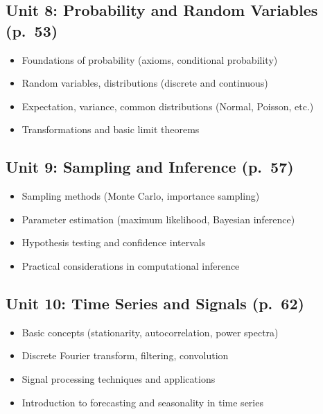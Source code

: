 \documentclass{article}
\begin{document}
\subsection*{Unit 8: Probability and Random Variables (p.~53)}
\begin{itemize}
    \item Foundations of probability (axioms, conditional probability) 
    \item Random variables, distributions (discrete and continuous) 
    \item Expectation, variance, common distributions (Normal, Poisson, etc.) 
    \item Transformations and basic limit theorems
\end{itemize}

\subsection*{Unit 9: Sampling and Inference (p.~57)}
\begin{itemize}
    \item Sampling methods (Monte Carlo, importance sampling) 
    \item Parameter estimation (maximum likelihood, Bayesian inference) 
    \item Hypothesis testing and confidence intervals 
    \item Practical considerations in computational inference
\end{itemize}

\subsection*{Unit 10: Time Series and Signals (p.~62)}
\begin{itemize}
    \item Basic concepts (stationarity, autocorrelation, power spectra) 
    \item Discrete Fourier transform, filtering, convolution 
    \item Signal processing techniques and applications 
    \item Introduction to forecasting and seasonality in time series
\end{itemize}
\end{document}
